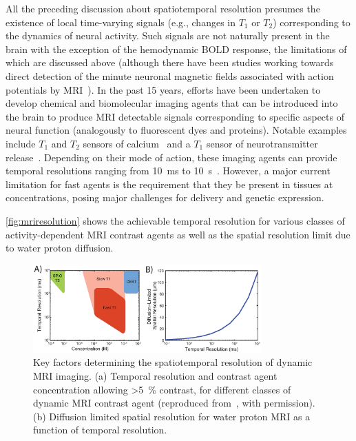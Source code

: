 All the preceding discussion about spatiotemporal resolution presumes the existence of local time-varying signals (e.g., changes in $T_1$ or $T_2$) corresponding to the dynamics of neural activity.
Such signals are not naturally present in the brain with the exception of the hemodynamic BOLD response, the limitations of which are discussed above (although there have been studies working towards direct detection of the minute neuronal magnetic fields associated with action potentials by MRI~\cite{Bodurka2002}).
In the past 15 years, efforts have been undertaken to develop chemical and biomolecular imaging agents that can be introduced into the brain to produce MRI detectable signals corresponding to specific aspects of neural function (analogously to fluorescent dyes and proteins).
Notable examples include $T_1$ and $T_2$ sensors of calcium~\cite{atanasijevic06,li99} and a $T_1$ sensor of neurotransmitter release~\cite{shapiro10}.
Depending on their mode of action, these imaging agents can provide temporal resolutions ranging from \SI{10}{\milli\second} to \SI{10}{\second}~\cite{shapiro06}.
However, a major current limitation for fast agents is the requirement that they be present in tissues at \si{\micro\Molar} concentrations, posing major challenges for delivery and genetic expression.

\autoref{fig:mriresolution} shows the achievable temporal resolution for various classes of activity-dependent MRI contrast agents as well as the spatial resolution limit due to water proton diffusion.

\begin{figure}[htbp]
\caption{Key factors determining the spatiotemporal resolution of dynamic MRI imaging. (a) Temporal resolution and contrast agent concentration allowing \SI{>5}{\percent} contrast, for different classes of dynamic MRI contrast agent (reproduced from~\cite{shapiro06}, with permission). (b) Diffusion limited spatial resolution for water proton MRI as a function of temporal resolution.}
\label{fig:mriresolution}
\centering
\includegraphics[width=0.78\textwidth]{figs/Fig6.eps}
\end{figure}

